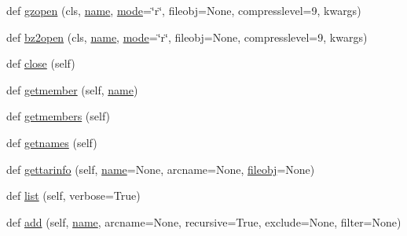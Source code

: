 \begin{DoxyCompactItemize}
\item 
def \hyperlink{classpip_1_1__vendor_1_1distlib_1_1__backport_1_1tarfile_1_1TarFile_a36f82ac3edac63fcc7f57f04375c9a0f}{gzopen} (cls, \hyperlink{classpip_1_1__vendor_1_1distlib_1_1__backport_1_1tarfile_1_1TarFile_a6ff7267d7833227b8bbcfa52f0a161be}{name}, \hyperlink{classpip_1_1__vendor_1_1distlib_1_1__backport_1_1tarfile_1_1TarFile_a9a3aef761fe71257514806a096386093}{mode}=\char`\"{}r\char`\"{}, fileobj=None, compresslevel=9, kwargs)
\item 
def \hyperlink{classpip_1_1__vendor_1_1distlib_1_1__backport_1_1tarfile_1_1TarFile_a6b0f5b55cdd64b94cc73871630cd24ab}{bz2open} (cls, \hyperlink{classpip_1_1__vendor_1_1distlib_1_1__backport_1_1tarfile_1_1TarFile_a6ff7267d7833227b8bbcfa52f0a161be}{name}, \hyperlink{classpip_1_1__vendor_1_1distlib_1_1__backport_1_1tarfile_1_1TarFile_a9a3aef761fe71257514806a096386093}{mode}=\char`\"{}r\char`\"{}, fileobj=None, compresslevel=9, kwargs)
\item 
def \hyperlink{classpip_1_1__vendor_1_1distlib_1_1__backport_1_1tarfile_1_1TarFile_a44e09ebb6092dccda9c5a528b99f0136}{close} (self)
\item 
def \hyperlink{classpip_1_1__vendor_1_1distlib_1_1__backport_1_1tarfile_1_1TarFile_a736cebd95f406c6874adc808e041f47f}{getmember} (self, \hyperlink{classpip_1_1__vendor_1_1distlib_1_1__backport_1_1tarfile_1_1TarFile_a6ff7267d7833227b8bbcfa52f0a161be}{name})
\item 
def \hyperlink{classpip_1_1__vendor_1_1distlib_1_1__backport_1_1tarfile_1_1TarFile_accd273f57ca72fcb0b71ca9a5ef4c857}{getmembers} (self)
\item 
def \hyperlink{classpip_1_1__vendor_1_1distlib_1_1__backport_1_1tarfile_1_1TarFile_a67eb1d86f0e22315acdbc8e15cd83a40}{getnames} (self)
\item 
def \hyperlink{classpip_1_1__vendor_1_1distlib_1_1__backport_1_1tarfile_1_1TarFile_aa64c5b98909e7c3064cbb52e5025794e}{gettarinfo} (self, \hyperlink{classpip_1_1__vendor_1_1distlib_1_1__backport_1_1tarfile_1_1TarFile_a6ff7267d7833227b8bbcfa52f0a161be}{name}=None, arcname=None, \hyperlink{classpip_1_1__vendor_1_1distlib_1_1__backport_1_1tarfile_1_1TarFile_acdc8fe454abf94472b594ac428420058}{fileobj}=None)
\item 
def \hyperlink{classpip_1_1__vendor_1_1distlib_1_1__backport_1_1tarfile_1_1TarFile_ab9aea2de950c8e5330ac6be26a8a3afd}{list} (self, verbose=True)
\item 
def \hyperlink{classpip_1_1__vendor_1_1distlib_1_1__backport_1_1tarfile_1_1TarFile_a79067a66314d66032cb43144c54355a2}{add} (self, \hyperlink{classpip_1_1__vendor_1_1distlib_1_1__backport_1_1tarfile_1_1TarFile_a6ff7267d7833227b8bbcfa52f0a161be}{name}, arcname=None, recursive=True, exclude=None, filter=None)

\end{DoxyCompactItemize}
